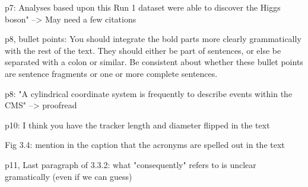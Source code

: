 p7:  Analyses based upon this Run 1 dataset were able to discover the Higgs boson" --> May need a few citations

p8, bullet points: You should integrate the bold parts more clearly grammatically with the rest of the text. 
They should either be part of sentences, or else be separated with a colon or similar.  
Be consistent about whether these bullet points are sentence fragments or one or more complete sentences.

p8: "A cylindrical coordinate system is frequently to describe events within the CMS" --> proofread

p10: I think you have the tracker length and diameter flipped in the text

Fig 3.4: mention in the caption that the acronyms are spelled out in the text

p11, Last paragraph of 3.3.2: what "consequently" refers to is unclear gramatically (even if we can guess)

